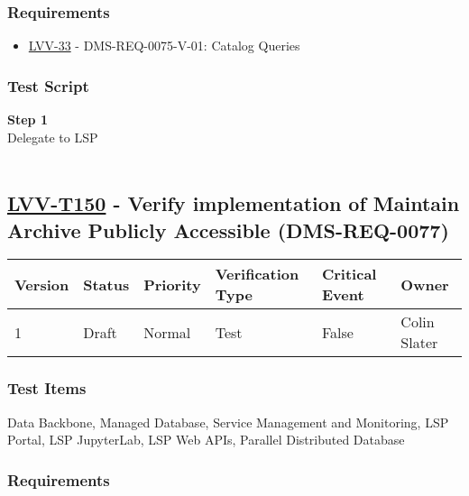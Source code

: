 \hypertarget{requirements-126}{%
\subsubsection{Requirements}\label{requirements-126}}

\begin{itemize}
\tightlist
\item
  \href{https://jira.lsstcorp.org/browse/LVV-33}{LVV-33} -
  DMS-REQ-0075-V-01: Catalog Queries
\end{itemize}

\hypertarget{test-script-126}{%
\subsubsection{Test Script}\label{test-script-126}}

\textbf{Step 1}\\
Delegate to LSP\\
~\\

\hypertarget{lvv-t150---verify-implementation-of-maintain-archive-publicly-accessible-dms-req-0077}{%
\subsection{\texorpdfstring{\href{https://jira.lsstcorp.org/secure/Tests.jspa\#/testCase/LVV-T150}{LVV-T150}
- Verify implementation of Maintain Archive Publicly Accessible
(DMS-REQ-0077)}{LVV-T150 - Verify implementation of Maintain Archive Publicly Accessible (DMS-REQ-0077)}}\label{lvv-t150---verify-implementation-of-maintain-archive-publicly-accessible-dms-req-0077}}

\begin{longtable}[]{@{}llllll@{}}
\toprule
Version & Status & Priority & Verification Type & Critical Event &
Owner\tabularnewline
\midrule
\endhead
1 & Draft & Normal & Test & False & Colin Slater\tabularnewline
\bottomrule
\end{longtable}

\hypertarget{test-items-126}{%
\subsubsection{Test Items}\label{test-items-126}}

Data Backbone, Managed Database, Service Management and Monitoring, LSP
Portal, LSP JupyterLab, LSP Web APIs, Parallel Distributed Database~

\hypertarget{requirements-127}{%
\subsubsection{Requirements}\label{requirements-127}}


